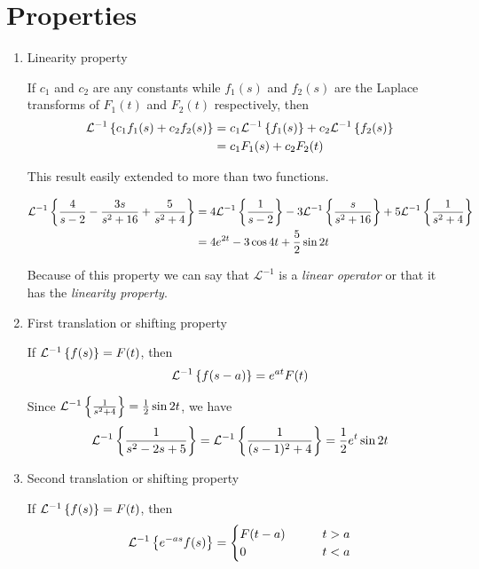 \documentclass[../main-sheet.tex]{subfiles}
\begin{document}
\section{Properties}
\begin{enumerate}
    \item Linearity property
    \begin{thm}
        If $ c_1 $ and $ c_2 $ are any constants while $ f_1(s) $ and $ f_2(s) $ are the Laplace transforms of $ F_1(t) $ and $ F_2(t) $ respectively, then
        \begin{align*}
            \mathcal{L}^{-1}\left\{ c_1 f_1(s)+c_2f_2(s)\right\}&=c_1\mathcal{L}^{-1}\left\{ f_1(s)\right\}+c_2\mathcal{L}^{-1}\left\{ f_2(s)\right\}\\
            &=c_1 F_1(s)+c_2 F_2(t)
        \end{align*}
    \end{thm}
    This result easily extended to more than two functions.
    \begin{ex}
        \begin{align*}
            \mathcal{L}^{-1}\left\{ \frac{4}{s-2}-\frac{3s}{s^2+16}+\frac{5}{s^2+4}\right\}&=4\mathcal{L}^{-1}\left\{ \frac{1}{s-2}\right\}-3\mathcal{L}^{-1}\left\{ \frac{s}{s^2+16}\right\}+5\mathcal{L}^{-1}\left\{ \frac{1}{s^2+4}\right\}\\
            &=4e^{2t}-3\cos 4t+\frac{5}{2}\sin 2t
        \end{align*}
    \end{ex}
    Because of this property we can say that $ \mathcal{L}^{-1}$ is a \emph{linear operator} or that it has the \emph{linearity property}.
    \item First translation or shifting property
    \begin{thm}
        If $ \mathcal{L}^{-1}\left\{ f(s)\right\}=F(t) $, then 
        \[
            \mathcal{L}^{-1}\left\{ f(s-a)\right\}=e^{at}F(t)
        \]
    \end{thm}
    \begin{ex}
        Since $ \mathcal{L}^{-1}\left\{ \frac{1}{s^2+4}\right\}=\frac{1}{2}\sin 2t $, we have 
        \[
            \mathcal{L}^{-1}\left\{ \frac{1}{s^2-2s+5}\right\}=\mathcal{L}^{-1}\left\{ \frac{1}{(s-1)^2+4}\right\}=\frac{1}{2}e^t \sin 2t
        \]
    \end{ex}
    \item Second translation or shifting property
    \begin{thm}
        If $ \mathcal{L}^{-1}\left\{ f(s)\right\}=F(t) $, then 
        \[
            \mathcal{L}^{-1}\left\{ e^{-as}f(s)\right\}=\begin{cases}
                 F(t-a) & \qquad t>a\\
                 0 & \qquad t<a
            \end{cases}
        \]
    \end{thm}

\end{enumerate}
\end{document}
